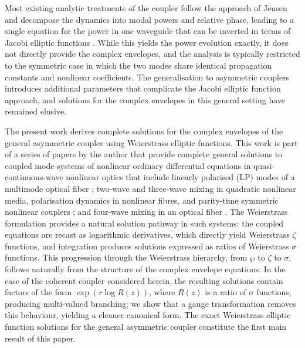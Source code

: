 \documentclass[11pt,a4paper]{article}
\numberwithin{equation}{section}
\begin{document}
Most existing analytic treatments of the coupler follow the approach of Jensen and decompose the dynamics into modal powers and relative phase, leading to a single equation for the power in one waveguide that can be inverted in terms of Jacobi elliptic functions \cite{jensenNonlinearCoherentCoupler1982}. 
While this yields the power evolution exactly, it does not directly provide the complex envelopes, and the analysis is typically restricted to the symmetric case in which the two modes share identical propagation constants and nonlinear coefficients. 
The generalisation to asymmetric couplers introduces additional parameters that complicate the Jacobi elliptic function approach, and solutions for the complex envelopes in this general setting have remained elusive.

The present work derives complete solutions for the complex envelopes of the general asymmetric coupler using Weierstrass elliptic functions. 
This work is part of a series of papers by the author that provide complete general solutions to coupled mode systems of nonlinear ordinary differential equations in quasi-continuous-wave nonlinear optics that include 
linearly polarised (LP) modes of a multimode optical fiber \cite{heskethNonlinearEffectsMultimode2014}; two-wave and three-wave mixing in quadratic nonlinear media, polarisation dynamics in nonlinear fibres, and parity-time symmetric nonlinear couplers \cite{heskethGeneralComplexEnvelope2015}; 
and four-wave mixing in an optical fiber \cite{heskethCompleteWeierstrassElliptic2026}.
The Weierstrass formulation provides a natural solution pathway in such systems: the coupled equations are recast as logarithmic derivatives, which directly yield Weierstrass $\zeta$ functions, and integration produces solutions expressed as ratios of Weierstrass $\sigma$ functions. 
This progression through the Weierstrass hierarchy, from $\wp$ to $\zeta$ to $\sigma$, follows naturally from the structure of the complex envelope equations. 
In the case of the coherent coupler considered herein, the resulting solutions contain factors of the form $\exp(r\log R(z))$, where $R(z)$ is a ratio of $\sigma$ functions, producing multi-valued branching; we show that a gauge transformation removes this behaviour, yielding a cleaner canonical form. 
The exact Weierstrass elliptic function solutions for the general asymmetric coupler constitute the first main result of this paper.
\end{document}
